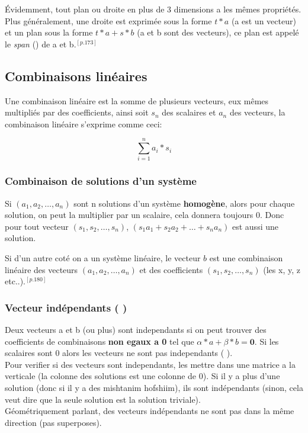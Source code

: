 \documentclass[12pt]{article}
\begin{document}
Évidemment, tout plan ou droite en plus de 3 dimensions a les mêmes propriétés. Plus généralement, une droite est exprimée sous la forme $t*a$ (a est un vecteur) et un plan sous la forme $t*a + s*b$ (a et b sont des vecteurs), ce plan est appelé le {\em span} () de a et b.$^{[p.173]}$ 

\subsection{Combinaisons linéaires}
Une combinaison linéaire est la somme de plusieurs vecteurs, eux mêmes multipliés par des coefficients, ainsi soit $s_n$ des scalaires et $a_n$ des vecteurs, la combinaison linéaire s'exprime comme ceci:

\begin{equation}
  \sum_{i=1}^{n} a_i * s_i
\end{equation}  

\subsubsection{Combinaison de solutions d'un système}

Si $(a_1, a_2, \ldots, a_n)$ sont n solutions d'un système \textbf{homogène}, alors pour chaque solution, on peut la multiplier par un scalaire, cela donnera toujours 0. Donc pour tout vecteur $(s_1, s_2, \ldots, s_n) $, $(s_1a_1 + s_2a_2 + \ldots + s_na_n)$ est aussi une solution.  

Si d'un autre coté on a un système linéaire, le vecteur $b$ est une combinaison linéaire des vecteurs $(a_1, a_2, \ldots, a_n)$ et des coefficients $(s_1, s_2, \ldots, s_n)$ (les x, y, z etc..).$^{[p.180]}$

\subsubsection{Vecteur indépendants ( )}
Deux vecteurs a et b (ou plus) sont independants si on peut trouver des coefficients de combinaisons \textbf{non egaux a 0} tel que $\alpha*a + \beta*b = \textbf{0}$. Si les scalaires sont 0 alors les vecteurs ne sont pas independants (  ). \\

Pour verifier si des vecteurs sont independants, les mettre dans une matrice a la verticale (la colonne des solutions est une colonne de 0). Si il y a plus d'une solution (donc si il y a des mishtanim hofshiim), ils sont indépendants (sinon, cela veut dire que la seule solution est la solution triviale).\\

Géométriquement parlant, des vecteurs indépendants ne sont pas dans la même direction (pas superposes). 
\end{document}
